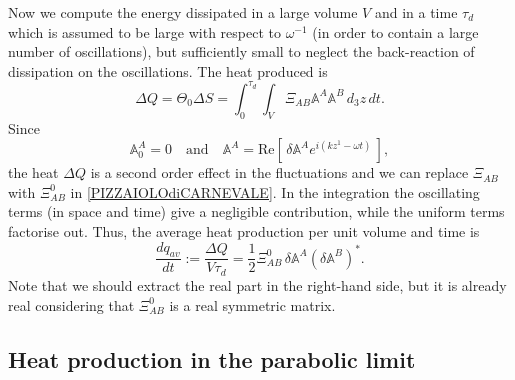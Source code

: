 \documentclass[useAMS,usenatbib,prd,twocolumn,nofootinbib]{revtex4-1}
\begin{document}
Now we compute the energy dissipated in a large volume $V$ and in a time $\tau_{d}$ which is assumed to be large with respect to $\omega^{-1}$ (in order to contain a large number of oscillations), but sufficiently small to neglect the back-reaction of dissipation on the oscillations.
The heat produced is 
\begin{equation}
\Delta Q = \Theta_0 \Delta S =\int_0^{\tau_d}  \int_V   \Xi_{AB} \mathbb{A}^A \mathbb{A}^B  \, d_3 z \,dt .
\label{PIZZAIOLOdiCARNEVALE}
\end{equation}
Since
\begin{equation}
\mathbb{A}^A_0 =0
\quad \text{and} \quad 
\mathbb{A}^A = \text{Re}\left[  \, \delta \mathbb{A}^A e^{i(kz^1-\omega t)} \, \right],
\end{equation}
the heat $\Delta Q $ is a second order effect in the fluctuations and we can replace $\Xi_{AB}$ with $\Xi_{AB}^0$
in \eqref{PIZZAIOLOdiCARNEVALE}.
In the integration  the oscillating terms (in space and time) give a negligible contribution, while the uniform terms factorise out. Thus, the average heat production per unit volume and time is
\begin{equation}\label{dqdt}
\dfrac{dq_{av}}{dt} := \dfrac{\Delta Q}{V \tau_d} = \dfrac{1}{2} \Xi_{AB}^0 \,     \delta\mathbb{A}^A (\delta\mathbb{A}^B)^* .
\end{equation}
Note that we should extract the real part in the right-hand side, but it is already real considering that $\Xi_{AB}^0$ is a real symmetric matrix.


\subsection{Heat production in the parabolic limit}\label{havana}
\end{document}
